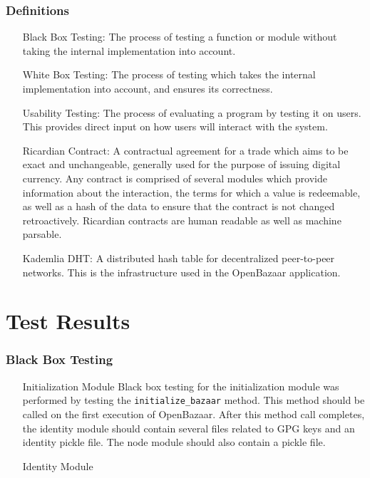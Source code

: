 \documentclass{article}
\begin{document}
\section{Definitions}
\begin{itemize}
\item[Black Box Testing:]
The process of testing a function or module without taking the internal implementation into account.

\item[White Box Testing:]
The process of testing which takes the internal implementation into account, and ensures its correctness.

\item[Usability Testing:]
The process of evaluating a program by testing it on users. This provides direct input on how users will interact with the system.

\item[Ricardian Contract:]
A contractual agreement for a trade which aims to be exact and unchangeable, generally used for the purpose of issuing digital currency. Any contract is comprised of several modules which provide information about the interaction, the terms for which a value is redeemable, as well as a hash of the data to ensure that the contract is not changed retroactively. Ricardian contracts are human readable as well as machine parsable.  

\item[Kademlia DHT:]
A distributed hash table for decentralized peer-to-peer networks. This is the infrastructure used in the OpenBazaar application.
\end{itemize}

\part*{Test Results}
\section{Black Box Testing}
\begin{itemize}
\item[Initialization Module]
Black box testing for the initialization module was performed by testing the \texttt{initialize\_bazaar} method. This method should be called on the first execution of OpenBazaar. After this method call completes, the identity module should contain several files related to GPG keys and an identity pickle file. The node module should also contain a pickle file.

\item[Identity Module]

\end{itemize}
\end{document}
